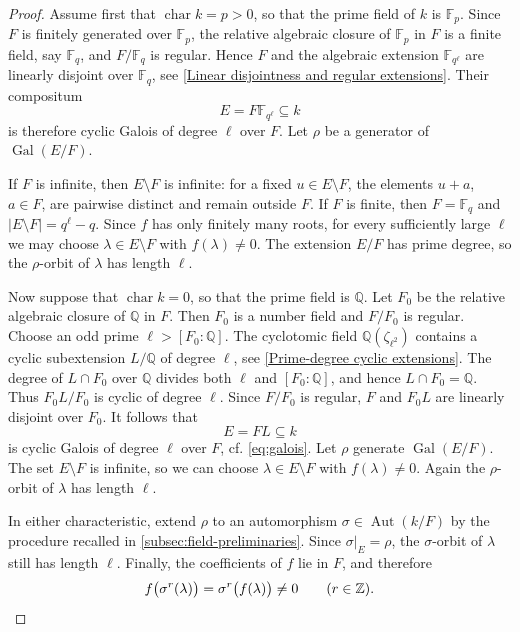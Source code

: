 \documentclass[11pt,letterpaper,reqno]{amsart}
\theoremstyle{definition}
\DeclareMathOperator{\Aut}{Aut}
\DeclareMathOperator{\Gal}{Gal}
\begin{document}
\begin{proof}


Assume first that $\operatorname{char}k=p>0$, so that the prime field of $k$ is $\mathbb F_p$. Since $F$ is finitely generated over $\mathbb F_p$, the relative algebraic
closure of $\mathbb F_p$ in $F$ is a finite field, say
$\mathbb F_{q}$, and $F/\mathbb F_{q}$ is regular.  Hence $F$ and the algebraic extension
$\mathbb F_{q^\ell}$ are linearly disjoint over $\mathbb F_{q}$, see \cref{Linear disjointness and regular extensions}.
Their compositum
\[
E=F\mathbb F_{q^\ell}\subseteq k
\]
is therefore cyclic Galois of degree $\ell$ over $F$.  Let $\rho$ be a
generator of $\Gal(E/F)$.

If $F$ is infinite, then $E\setminus F$ is infinite: for a fixed
$u\in E\setminus F$, the elements $u+a$, $a\in F$, are pairwise distinct
and remain outside $F$.  If $F$ is finite, then $F=\mathbb F_{q}$ and $|E\setminus F|=q^\ell-q$. Since $f$ has only finitely many roots, for every sufficiently large
$\ell$ we may choose $\lambda\in E\setminus F$ with $f(\lambda)\neq0$.
The extension $E/F$ has prime degree, so the $\rho$-orbit of $\lambda$ has
length $\ell$.

Now suppose that $\operatorname{char}k=0$, so that the prime field is $\mathbb Q$.
Let $F_0$ be the relative
algebraic closure of $\mathbb Q$ in $F$.  Then $F_0$ is a number field and
$F/F_0$ is regular.  Choose an odd prime $\ell>[F_0:\mathbb Q]$. The cyclotomic field $\mathbb Q(\zeta_{\ell^2})$ contains a cyclic
subextension $L/\mathbb Q$ of degree $\ell$, see \cref{Prime-degree cyclic extensions}.  The degree of
$L\cap F_0$ over $\mathbb Q$ divides both $\ell$ and
$[F_0:\mathbb Q]$, and hence $L\cap F_0=\mathbb Q$. Thus $F_0L/F_0$ is cyclic of degree $\ell$.  
Since $F/F_0$ is regular,
$F$ and $F_0L$ are linearly disjoint over $F_0$.  It follows that
\[
E=FL\subseteq k
\]
is cyclic Galois of degree $\ell$ over $F$, cf. \eqref{eq:galois}.  Let $\rho$ generate
$\Gal(E/F)$.  The set $E\setminus F$ is infinite, so we can choose
$\lambda\in E\setminus F$ with $f(\lambda)\neq0$.  Again the $\rho$-orbit
of $\lambda$ has length $\ell$.

In either characteristic, extend $\rho$ to an automorphism
$\sigma\in\Aut(k/F)$ by the procedure recalled in
\cref{subsec:field-preliminaries}.  Since $\sigma|_E=\rho$, the
$\sigma$-orbit of $\lambda$ still has length $\ell$.  Finally, the
coefficients of $f$ lie in $F$, and therefore
\[
f\bigl(\sigma^r(\lambda)\bigr)
 =\sigma^r\bigl(f(\lambda)\bigr)\neq0
\qquad(r\in\mathbb Z).
\qedhere\]
\end{proof}
\end{document}
